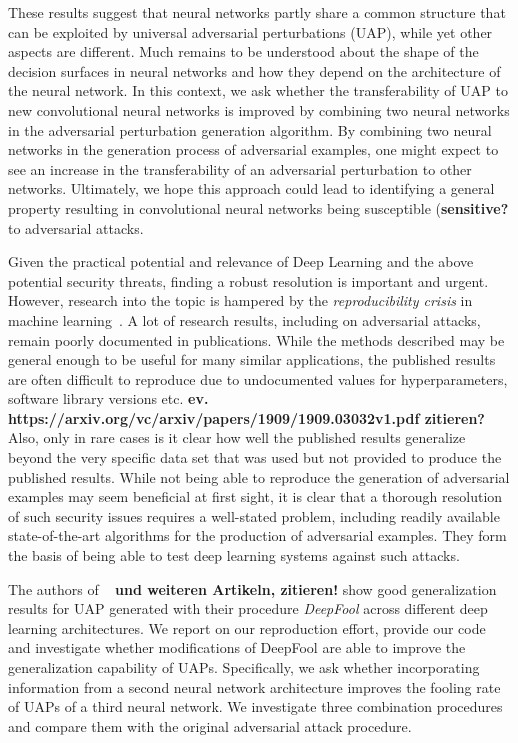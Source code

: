 \documentclass[runningheads]{llncs}
\begin{document}
These results suggest that neural networks partly share a common structure that can be exploited by universal adversarial perturbations (UAP), while yet other aspects are different. Much remains to be understood about the shape of the decision surfaces in neural networks and how they depend on the architecture of the neural network. In this context, we ask whether the transferability of UAP to new convolutional neural networks is improved by combining two neural networks in the adversarial perturbation generation algorithm. By combining two neural networks in the generation process of adversarial examples, one might expect to see an increase in the transferability of an adversarial perturbation to other networks. Ultimately, we hope this approach could lead to identifying a general property resulting in convolutional neural networks being susceptible ({\bf sensitive?} to adversarial attacks.

Given the practical potential and relevance of Deep Learning and the above potential security threats, finding a robust resolution is important and urgent. However, research into the topic is hampered by the \emph{reproducibility crisis} in machine learning~\cite{raff2020quantifying}. A lot of research results, including on adversarial attacks, remain poorly documented in publications. While the methods described may be general enough to be useful for many similar applications, 
the published results are often difficult to reproduce due to undocumented values for hyperparameters, software library versions etc. {\bf ev. https://arxiv.org/vc/arxiv/papers/1909/1909.03032v1.pdf zitieren?}
Also, only in rare cases is it clear how well the published results generalize beyond the very specific data set that was used but not provided to produce the published results. While not being able to reproduce the generation of adversarial examples may seem beneficial at first sight, it is clear that a thorough resolution of such security issues requires a well-stated problem, including readily available state-of-the-art algorithms for the production of adversarial examples. They form the basis of being able to test deep learning systems against such attacks. 

The authors of ~\cite{moosavi-dezfooli_universal_2017} {\bf und weiteren Artikeln, zitieren!} show good generalization results for UAP generated with their procedure \emph{DeepFool}\cite{DeepFool-Moosavi-Dezfooli15} across different deep learning architectures. We report on our reproduction effort, provide our code and investigate whether modifications of DeepFool are able to improve the generalization capability of UAPs. Specifically, we ask whether incorporating information from a second neural network architecture improves the fooling rate of UAPs of a third neural network. We investigate three combination procedures and compare them with the original adversarial attack procedure.
\end{document}

